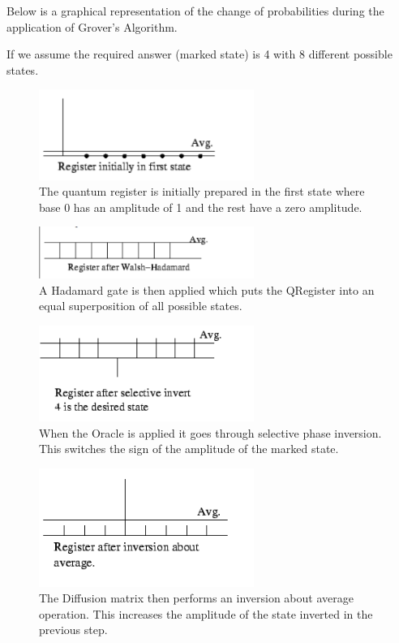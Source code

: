Below is a graphical representation of the change of probabilities during the application of Grover's Algorithm.

If we assume the required answer (marked state) is 4 with 8 different possible states. 

\begin{figure}[H]
	\centering
	\includegraphics[width=70mm]{./images/grover_initial}
	\caption{The quantum register is initially prepared in the first state where base 0 has an amplitude of 1 and the rest have a zero amplitude. \cite{grovergraph} }
\end{figure}

\begin{figure}[H]
	\centering
	\includegraphics[width=70mm]{./images/grover_hadamard}
	\caption{A Hadamard gate is then applied which puts the QRegister into an equal superposition of all possible states. \cite{grovergraph}  }
\end{figure}

\begin{figure}[H]
	\centering
	\includegraphics[width=70mm]{./images/grover_invert}
	\caption{When the Oracle is applied it goes through selective phase inversion. This switches the sign of the amplitude of the marked state. \cite{grovergraph} }
\end{figure}

\begin{figure}[H]
	\centering
	\includegraphics[width=70mm]{./images/afterinv}
	\caption{The Diffusion matrix then performs an inversion about average operation. This increases the amplitude of the state inverted in the previous step. \cite{grovergraph} }
\end{figure}
